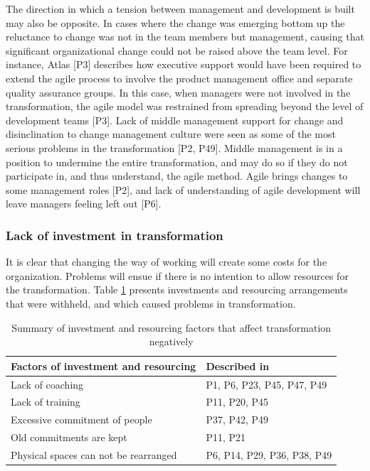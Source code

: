 The direction in which a tension between management and development is built may
also be opposite. In cases where the change was emerging bottom up the
reluctance to change was not in the team members but management, causing that
significant organizational change could not be raised above the team level. For
instance, Atlas [P3] describes how executive support would have been required to
extend the agile process to involve the product management office and separate
quality assurance groups. In this case, when managers %
were not involved in the transformation, the agile model was restrained from
spreading beyond the level of development teams [P3]. Lack of middle management
support for change and disinclination to change management culture were seen as
some of the most serious problems in the transformation [P2, P49]. Middle
management is in a position to undermine the entire transformation, and may do
so if they do not participate in, and thus understand, the agile method. Agile
brings changes to some management roles [P2], and lack of understanding of agile
development will leave managers feeling left out [P6].


\subsubsection{Lack of investment in transformation}

It is clear that changing the way of working will create some costs for the
organization. Problems will ensue if there is no intention to allow resources
for the transformation. Table \ref{table:challenges_lackofinvestment} presents
investments and resourcing arrangements that were withheld, and which caused
problems in transformation.

\begin{table}[h]
    \centering
    \begin{tabular}{ l l }
        \toprule
        Factors of investment and resourcing  &  Described in \\
        \midrule
        Lack of coaching                      &  P1, P6, P23, P45, P47, P49  \\
        Lack of training                      &  P11, P20, P45  \\
        Excessive commitment of people        &  P37, P42, P49  \\
        Old commitments are kept              &  P11, P21  \\
        Physical spaces can not be rearranged  &  P6, P14, P29, P36, P38, P49  \\
        \bottomrule
    \end{tabular}
    \caption{Summary of investment and resourcing factors that affect
             transformation negatively}
    \label{table:challenges_lackofinvestment}
\end{table}

